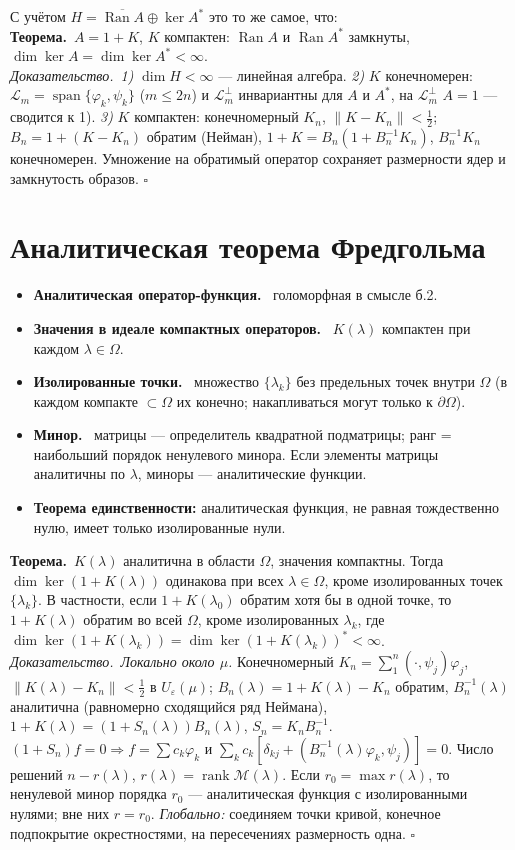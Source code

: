 \documentclass[11pt,a4paper]{article}
\newcommand{\Lc}{\mathcal L}
\newcommand{\Ran}{\operatorname{Ran}}
\newcommand{\df}[1]{\textbf{#1.}~}
\newcommand{\thm}{\textbf{Теорема.}~}
\newcommand{\pf}{\textit{Доказательство.}~}
\newcommand{\qedd}{\hfill$\square$}
\begin{document}
С учётом $H=\overline{\Ran A}\oplus\ker A^*$ это то же самое, что:\\
\thm $A=1+K$, $K$ компактен: $\Ran A$ и $\Ran A^*$ замкнуты, $\dim\ker A=\dim\ker A^*<\infty$.\\
\pf \textit{1)} $\dim H<\infty$ — линейная алгебра.
\textit{2)} $K$ конечномерен: $\Lc_m=\operatorname{span}\{\varphi_k,\psi_k\}$ ($m\le2n$) и $\Lc_m^\perp$ инвариантны для $A$ и $A^*$, на $\Lc_m^\perp$ $A=1$ — сводится к 1).
\textit{3)} $K$ компактен: конечномерный $K_n$, $\|K-K_n\|<\frac12$; $B_n=1+(K-K_n)$ обратим (Нейман), $1+K=B_n(1+B_n^{-1}K_n)$, $B_n^{-1}K_n$ конечномерен. Умножение на обратимый оператор сохраняет размерности ядер и замкнутость образов. \qedd

\section{Аналитическая теорема Фредгольма}
\begin{defs}
\begin{itemize}
\item \df{Аналитическая оператор-функция} голоморфная в смысле б.2.
\item \df{Значения в идеале компактных операторов} $K(\lambda)$ компактен при каждом $\lambda\in\Omega$.
\item \df{Изолированные точки} множество $\{\lambda_k\}$ без предельных точек внутри $\Omega$ (в каждом компакте $\subset\Omega$ их конечно; накапливаться могут только к $\partial\Omega$).
\item \df{Минор} матрицы — определитель квадратной подматрицы; ранг = наибольший порядок ненулевого минора. Если элементы матрицы аналитичны по $\lambda$, миноры — аналитические функции.
\item \textbf{Теорема единственности:} аналитическая функция, не равная тождественно нулю, имеет только изолированные нули.
\end{itemize}
\end{defs}

\thm $K(\lambda)$ аналитична в области $\Omega$, значения компактны. Тогда $\dim\ker(1+K(\lambda))$ одинакова при всех $\lambda\in\Omega$, кроме изолированных точек $\{\lambda_k\}$. В частности, если $1+K(\lambda_0)$ обратим хотя бы в одной точке, то $1+K(\lambda)$ обратим во всей $\Omega$, кроме изолированных $\lambda_k$, где $\dim\ker(1+K(\lambda_k))=\dim\ker(1+K(\lambda_k))^*<\infty$.\\
\pf \textit{Локально около $\mu$.} Конечномерный $K_n=\sum_1^n(\cdot,\psi_j)\varphi_j$, $\|K(\lambda)-K_n\|<\frac12$ в $U_\varepsilon(\mu)$; $B_n(\lambda)=1+K(\lambda)-K_n$ обратим, $B_n^{-1}(\lambda)$ аналитична (равномерно сходящийся ряд Неймана), $1+K(\lambda)=(1+S_n(\lambda))B_n(\lambda)$, $S_n=K_nB_n^{-1}$. $(1+S_n)f=0\Rightarrow f=\sum c_k\varphi_k$ и
$\sum_kc_k[\delta_{kj}+(B_n^{-1}(\lambda)\varphi_k,\psi_j)]=0$. Число решений $n-r(\lambda)$, $r(\lambda)=\operatorname{rank}\mathcal M(\lambda)$. Если $r_0=\max r(\lambda)$, то ненулевой минор порядка $r_0$ — аналитическая функция с изолированными нулями; вне них $r=r_0$.
\textit{Глобально:} соединяем точки кривой, конечное подпокрытие окрестностями, на пересечениях размерность одна. \qedd
\end{document}
